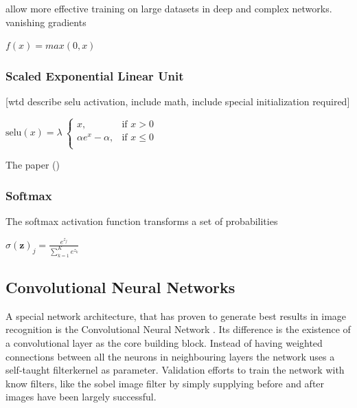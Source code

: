  allow more effective training on large datasets in deep and complex networks.  vanishing gradients \cite{Hochreiter:01book}

{\centering
	$f(x)=max(0, x)$\par
}

\subsubsection{Scaled Exponential Linear Unit}
[wtd describe selu activation, include math, include special initialization required]


{\centering
	$\text{selu}(x) = \lambda\ \begin{cases}
    x,& \text{if } x > 0\\
    \alpha e^{x} - \alpha,& \text{if } x\leq 0\\
	\end{cases}$
	\par
}


The paper (\cite{DBLP:journals/corr/KlambauerUMH17})


\subsubsection{Softmax}
The softmax activation function transforms a set of probabilities

{\centering
	$\displaystyle \sigma (\mathbf {z} )_{j}={\frac {e^{z_{j}}}{\sum _{k=1}^{K}e^{z_{k}}}}$
	\par
}

\subsection{Convolutional Neural Networks}



A special network architecture, that has proven to generate best results in image recognition is the Convolutional Neural Network \cite{Lecun98gradient-basedlearning}.
Its difference is the existence of a convolutional layer as the core building block.
Instead of having weighted connections between all the neurons in neighbouring layers the network uses a self-taught filterkernel as parameter. Validation efforts to train the network with know filters, like the sobel image filter by simply supplying before and after images have been largely successful.

